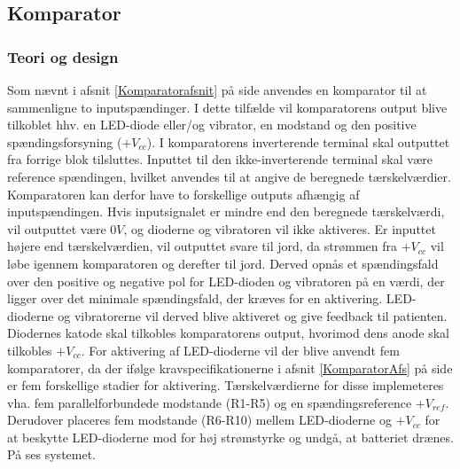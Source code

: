 \subsection{Komparator}
\subsubsection{Teori og design}
Som nævnt i afsnit \ref{Komparatorafsnit} på side \pageref{Komparatorafsnit} anvendes en komparator til at sammenligne to inputspændinger. I dette tilfælde vil komparatorens output blive tilkoblet hhv. en LED-diode eller/og vibrator, en modstand og den positive spændingsforsyning ($+V_{cc}$). I komparatorens inverterende terminal skal outputtet fra forrige blok tilsluttes. Inputtet til den ikke-inverterende terminal skal være reference spændingen, hvilket anvendes til at angive de beregnede tærskelværdier. Komparatoren kan derfor have to forskellige outputs afhængig af inputspændingen. Hvis inputsignalet er mindre end den beregnede tærskelværdi, vil outputtet være $0V$, og dioderne og vibratoren vil ikke aktiveres. Er inputtet højere end tærskelværdien, vil outputtet svare til jord, da strømmen fra $+V_{cc}$ vil løbe igennem komparatoren og derefter til jord. Derved opnås et spændingsfald over den positive og negative pol for LED-dioden og vibratoren på en værdi, der ligger over det minimale spændingsfald, der kræves for en aktivering. LED-dioderne og vibratorerne vil derved blive aktiveret og give feedback til patienten. \\
Diodernes katode skal tilkobles komparatorens output, hvorimod dens anode skal tilkobles $+V_{cc}$. For aktivering af LED-dioderne vil der blive anvendt fem komparatorer, da der ifølge kravspecifikationerne i afsnit \ref{KomparatorAfs} på side \pageref{KomparatorAfs} er fem forskellige stadier for aktivering. Tærskelværdierne for disse implemeteres vha. fem parallelforbundede modstande (R1-R5) og en spændingsreference $+V_{ref}$. Derudover placeres fem modstande (R6-R10) mellem LED-dioderne og $+V_{cc}$ for at beskytte LED-dioderne mod for høj strømstyrke og undgå, at batteriet drænes. På  ses systemet.\\


